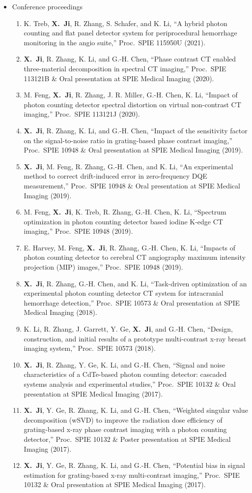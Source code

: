 \documentclass[letterpaper,11pt]{article}
\newcommand{\xji}{\textbf{X.~Ji}}
\begin{document}
\begin{itemize}
\item Conference proceedings
\begin{enumerate}\justifying
  \item K. Treb, \xji, R. Zhang, S. Schafer, and K. Li, “A hybrid photon counting and flat panel detector system for periprocedural hemorrhage monitoring in the angio suite,” Proc.~SPIE 115950U (2021).
\item \xji, R. Zhang, K. Li, and G.-H. Chen, ``Phase contrast CT enabled three-material decomposition in spectral CT imaging,'' Proc.~SPIE 113121B \& Oral presentation at SPIE Medical Imaging (2020).
\item M. Feng, \xji, R. Zhang, J. R. Miller, G.-H. Chen, K. Li, ``Impact of photon counting detector spectral distortion on virtual non-contrast CT imaging,'' Proc.~SPIE 113121J (2020).
\item \xji, R. Zhang, K. Li, and G.-H. Chen, ``Impact of the sensitivity factor on the signal-to-noise ratio in grating-based phase contrast imaging,'' Proc.~SPIE 10948 \& Oral presentation at SPIE Medical Imaging (2019).
\item \xji, M. Feng, R. Zhang, G.-H. Chen, and K. Li, ``An experimental method to correct drift-induced error in zero-frequency DQE measurement,'' Proc.~SPIE 10948 \& Oral presentation at SPIE Medical Imaging (2019).
\item M. Feng, \xji, K. Treb, R. Zhang, G.-H. Chen, K. Li, ``Spectrum optimization in photon counting detector based iodine K-edge CT imaging,'' Proc.~SPIE 10948 (2019).
\item E. Harvey, M. Feng, \xji, R. Zhang, G.-H. Chen, K. Li, ``Impacts of photon counting detector to cerebral CT angiography maximum intensity projection (MIP) images,'' Proc.~SPIE 10948 (2019).
\item \xji, R. Zhang, G.-H. Chen, and K. Li, ``Task-driven optimization of an experimental photon counting detector CT system for intracranial hemorrhage detection,'' Proc.~SPIE 10573 \& Oral presentation at SPIE Medical Imaging (2018).
\item K. Li, R. Zhang, J. Garrett, Y. Ge, \xji, and G.-H. Chen, ``Design, construction, and initial results of a prototype multi-contrast x-ray breast imaging system,'' Proc.~SPIE 10573 (2018).
\item \xji, R. Zhang, Y. Ge, K. Li, and G.-H. Chen, ``Signal and noise characteristics of a CdTe-based photon counting detector: cascaded systems analysis and experimental studies,'' Proc.~SPIE 10132 \& Oral presentation at SPIE Medical Imaging (2017).
\item \xji, Y. Ge, R. Zhang, K. Li, and G.-H. Chen, ``Weighted singular value decomposition (wSVD) to improve the radiation dose efficiency of grating-based x-ray phase contrast imaging with a photon counting detector,'' Proc.~SPIE 10132 \& Poster presentation at SPIE Medical Imaging (2017).
\item \xji, Y. Ge, R. Zhang, K. Li, and G.-H. Chen, ``Potential bias in signal estimation for grating-based x-ray multi-contrast imaging,'' Proc.~SPIE 10132 \& Oral presentation at SPIE Medical Imaging (2017).
\end{enumerate}
 

\end{itemize}
\end{document}
